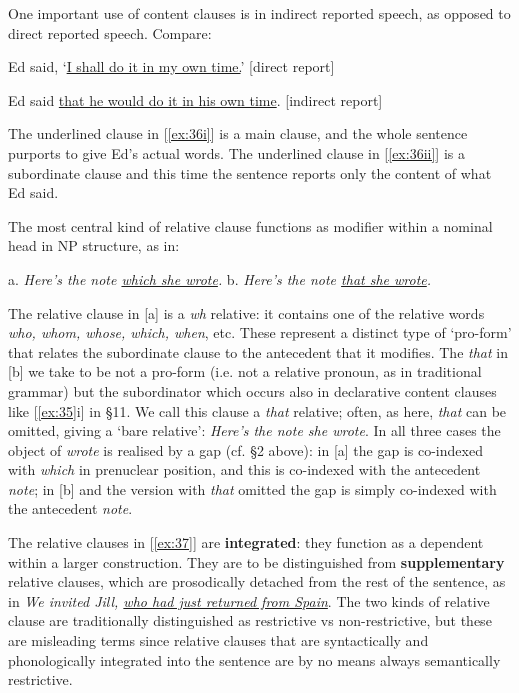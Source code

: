One important use of content clauses is in {indirect reported speech}, as opposed to {direct reported speech}. Compare:
\begin{examples}
\item \label{ex:36}
    \begin{examples}
        \item \label{ex:36i} Ed said, `\uline{I shall do it in my own time.}' \hfill \textnormal{[direct report]}
        \item \label{ex:36ii} Ed said \uline{that he would do it in his own time}. \hfill \textnormal{[indirect report]}
    \end{examples}
\end{examples}
The underlined clause in [\ref{ex:36i}] is a main clause, and the whole sentence purports to give Ed's actual words. The underlined clause in [\ref{ex:36ii}] is a subordinate clause and this time the sentence reports only the content of what Ed said.


The most central kind of relative clause functions as modifier within a nominal head in NP structure, as in:
\begin{examples}
\item \label{ex:37}
        a. \textit{Here's \ob the note \uline{which she wrote}\cb.}\hspace{3em}
        b. \textit{Here's \ob the note \uline{that she wrote}\cb.}
\end{examples}
The relative clause in [a] is a {\textit{wh} relative}: it contains one of the relative words \textit{who, whom, whose, which, when}, etc. These represent a distinct type of `pro-form' that relates the subordinate clause to the antecedent that it modifies. The \textit{that} in [b] we take to be not a pro-form (i.e. not a relative pronoun, as in traditional grammar) but the subordinator which occurs also in declarative content clauses like [\ref{ex:35}i] in §11. We call this clause a {\textit{that} relative}; often, as here, \textit{that} can be omitted, giving a `{bare relative}': \textit{Here's \ob the note she wrote\cb}. In all three cases the object of \textit{wrote} is realised by a gap (cf. §2 above): in [a] the gap is co-indexed with \textit{which} in prenuclear position, and this is co-indexed with the antecedent \textit{note}; in [b] and the version with \textit{that} omitted the gap is simply co-indexed with the antecedent \textit{note}.

The relative clauses in [\ref{ex:37}] are \textbf{integrated}: they function as a dependent within a larger construction. They are to be distinguished from \textbf{supplementary} relative clauses, which are prosodically detached from the rest of the sentence, as in \textit{We invited Jill, \uline{who had just returned from Spain}}. The two kinds of relative clause are traditionally distinguished as restrictive vs non-restrictive, but these are misleading terms since relative clauses that are syntactically and phonologically integrated into the sentence are by no means always semantically restrictive.

